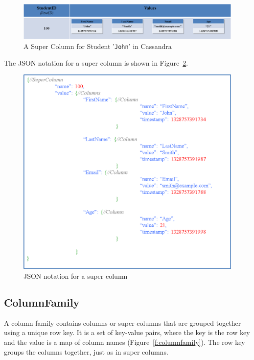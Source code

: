 \begin{figure}[H]
	\centering
	\includegraphics[width=\textwidth]{./figure/Example/SuperColumn_John.png}
	\caption{A Super Column for Student '\texttt{John}' in
	Cassandra}\label{f:supercolumn-John}
\end{figure}

\newpage

The JSON notation for a super column is shown in Figure~\ref{f:supercolumn-JSON}. 


\begin{figure}[H]
	\centering
	\includegraphics[width=.9\textwidth]{./figure/Example/JSON_SuperColumn_John.png}
	\caption{JSON notation for a super column}\label{f:supercolumn-JSON}
\end{figure}


\subsection{ColumnFamily}
 A column family contains columns or super columns that are
grouped together using a unique row key.  It is a set of key-value
pairs,   where the key is the row key and the value is a map of column names
(Figure~\ref{f:columnfamily}).  The row key groups the columns together,   just as
in super columns. 

